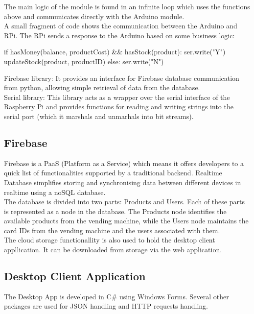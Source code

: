 \documentclass[a4paper,11pt]{article}
\begin{document}
The main logic of the module is found in an infinite loop which uses the functions above and communicates directly with the Arduino module.\\

A small fragment of code shows the communication between the Arduino and RPi. The RPi sends a response to the Arduino based on some business logic:
\begin{python}
if hasMoney(balance, productCost) && hasStock(product):
	ser.write("Y")
	updateStock(product, productID)
else:
	ser.write("N")
\end{python}

Firebase library: It provides an interface for Firebase database communication from python, allowing simple retrieval of data from the database.\\

Serial library: This library acts as a wrapper over the serial interface of the Raspberry Pi and provides functions for reading and writing strings into the serial port (which it marshals and unmarhals into bit streams).
\subsection{Firebase}

Firebase is a PaaS (Platform as a Service) which means it offers developers to a quick list of functionalities supported by a traditional backend.
Realtime Database simplifies storing and synchronising data between different devices in realtime using a noSQL database.\\

The database is divided into two parts: Products and Users. Each of these parts is represented as a node in the database. The Products node identifies the available products from the vending machine, 
while the Users node maintains the card IDs from the vending machine and the users associated with them.\\

The cloud storage functionallity is also used to hold the desktop client appllication. It can be downloaded from storage via the web application.
\subsection{Desktop Client Application}
The Desktop App is developed in C\# using Windows Forms. Several other packages are used for JSON handling and HTTP requests handling.\\
 
\end{document}
